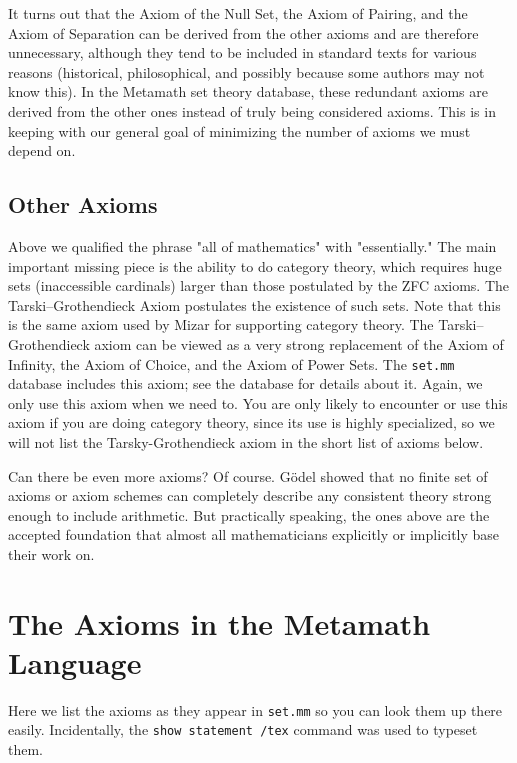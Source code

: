 It turns out that the Axiom of the Null Set, the Axiom of Pairing, and the
Axiom of Separation can be derived from the other axioms and are therefore
unnecessary, although they tend to be included in standard texts for various
reasons (historical, philosophical, and possibly because some authors may not
know this).  In the Metamath set theory database, these
redundant axioms are derived from the other ones instead of truly
being considered axioms.
This is in keeping with our general goal of minimizing the number of
axioms we must depend on.

\subsection{Other Axioms}

Above we qualified the phrase "all of mathematics" with "essentially."
The main important missing piece is the ability to do category theory,
which requires huge sets (inaccessible cardinals) larger than those
postulated by the ZFC axioms. The Tarski--Grothendieck Axiom postulates
the existence of such sets.
Note that this is the same axiom used by Mizar for supporting
category theory.
The Tarski--Grothendieck axiom
can be viewed as a very strong replacement of the Axiom of Infinity,
the Axiom of Choice, and the Axiom of Power Sets.
The \texttt{set.mm} database includes this axiom; see the database
for details about it.
Again, we only use this axiom when we need to.
You are only likely to encounter or use this axiom if you are doing
category theory, since its use is highly specialized,
so we will not list the Tarsky-Grothendieck axiom
in the short list of axioms below.

Can there be even more axioms?
Of course.
G\"{o}del showed that no finite set of axioms or axiom schemes can completely
describe any consistent theory strong enough to include arithmetic.
But practically speaking, the ones above are the accepted foundation that
almost all mathematicians explicitly or implicitly base their work on.

\section{The Axioms in the Metamath Language}\label{metaaxioms}

Here we list the axioms as they appear in
\texttt{set.mm} so you can
look them up there easily.  Incidentally, the \texttt{show statement
/tex} command was used to
typeset them.

